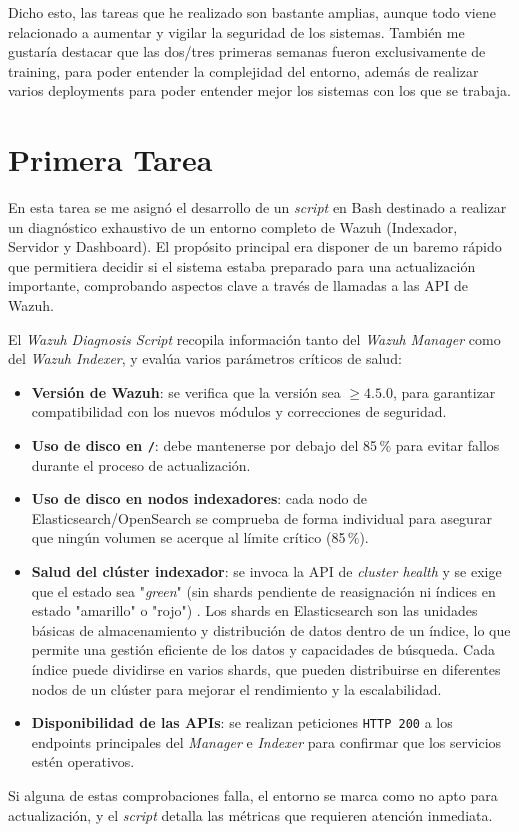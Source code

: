 Dicho esto, las tareas que he realizado son bastante amplias, aunque todo viene relacionado a aumentar y vigilar la seguridad de los sistemas. También me gustaría destacar que las dos/tres primeras semanas fueron exclusivamente de training, para poder entender la complejidad del entorno, además de realizar varios deployments para poder entender mejor los sistemas con los que se trabaja.

\section{Primera Tarea}
En esta tarea se me asignó el desarrollo de un \emph{script} en Bash destinado a realizar un diagnóstico exhaustivo de un entorno completo de Wazuh (Indexador, Servidor y Dashboard). El propósito principal era disponer de un baremo rápido que permitiera decidir si el sistema estaba preparado para una actualización importante, comprobando aspectos clave a través de llamadas a las API de Wazuh. 

El \emph{Wazuh Diagnosis Script} recopila información tanto del \emph{Wazuh Manager} como del \emph{Wazuh Indexer}, y evalúa varios parámetros críticos de salud:
\begin{itemize}
  \item \textbf{Versión de Wazuh}: se verifica que la versión sea \(\geq 4.5.0\), para garantizar compatibilidad con los nuevos módulos y correcciones de seguridad.
  \item \textbf{Uso de disco en \texttt{/}}: debe mantenerse por debajo del 85\,\% para evitar fallos durante el proceso de actualización.
  \item \textbf{Uso de disco en nodos indexadores}: cada nodo de Elasticsearch/OpenSearch se comprueba de forma individual para asegurar que ningún volumen se acerque al límite crítico (85\,\%).
  \item \textbf{Salud del clúster indexador}: se invoca la API de \emph{cluster health} y se exige que el estado sea "\emph{green}" (sin shards pendiente de reasignación ni índices en estado "amarillo" o "rojo") \cite{wazuh_homepage}. Los shards en Elasticsearch son las unidades básicas de almacenamiento y distribución de datos dentro de un índice, lo que permite una gestión eficiente de los datos y capacidades de búsqueda. Cada índice puede dividirse en varios shards, que pueden distribuirse en diferentes nodos de un clúster para mejorar el rendimiento y la escalabilidad.
  \item \textbf{Disponibilidad de las APIs}: se realizan peticiones \texttt{HTTP 200} a los endpoints principales del \emph{Manager} e \emph{Indexer} para confirmar que los servicios estén operativos.
\end{itemize}
Si alguna de estas comprobaciones falla, el entorno se marca como no apto para actualización, y el \emph{script} detalla las métricas que requieren atención inmediata.

